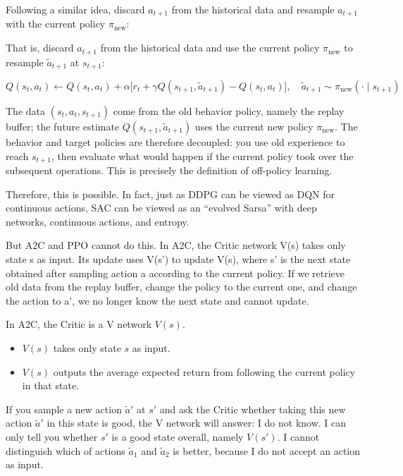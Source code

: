 Following a similar idea, discard \(a_{t+1}\) from the historical data and resample \(a_{t+1}\) with the current policy \(\pi_{\mathrm{new}}\):

That is, discard \(a_{t+1}\) from the historical data and use the current policy \(\pi_{\mathrm{new}}\) to resample \(\tilde{a}_{t+1}\) at \(s_{t+1}\):

\[
Q(s_t,a_t)
\leftarrow
Q(s_t,a_t)
+
\alpha
\bigl[
r_t
+
\gamma Q(s_{t+1},\tilde{a}_{t+1})
-
Q(s_t,a_t)
\bigr],
\quad
\tilde{a}_{t+1}\sim\pi_{\mathrm{new}}(\cdot\mid s_{t+1})
\]

The data \((s_t,a_t,s_{t+1})\) come from the old behavior policy, namely the replay buffer; the future estimate \(Q(s_{t+1},\tilde{a}_{t+1})\) uses the current new policy \(\pi_{\mathrm{new}}\). The behavior and target policies are therefore decoupled: you use old experience to reach \(s_{t+1}\), then evaluate what would happen if the current policy took over the subsequent operations. This is precisely the definition of off-policy learning.

Therefore, this is possible. In fact, just as DDPG can be viewed as DQN for continuous actions, SAC can be viewed as an ``evolved Sarsa'' with deep networks, continuous actions, and entropy.

But A2C and PPO cannot do this. In A2C, the Critic network V(s) takes only state s as input. Its update uses V(s') to update V(s), where s' is the next state obtained after sampling action a according to the current policy. If we retrieve old data from the replay buffer, change the policy to the current one, and change the action to a', we no longer know the next state and cannot update.

In A2C, the Critic is a V network \(V(s)\).

\begin{itemize}
\tightlist
\item
  \(V(s)\) takes only state \(s\) as input.
\item
  \(V(s)\) outputs the average expected return from following the current policy in that state.
\end{itemize}

If you sample a new action \(\tilde{a}'\) at \(s'\) and ask the Critic whether taking this new action \(\tilde{a}'\) in this state is good, the V network will answer: I do not know. I can only tell you whether \(s'\) is a good state overall, namely \(V(s')\). I cannot distinguish which of actions \(\tilde{a}_1\) and \(\tilde{a}_2\) is better, because I do not accept an action as input.

